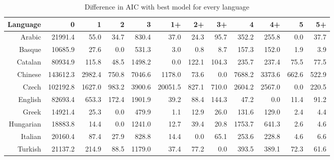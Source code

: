\documentclass[paper=a4, fontsize=11pt]{scrartcl} %
\begin{document}
\begin{table}
\begin{adjustbox}{center}
\centering
\begin{tabular}{rrrrrrrrrrrr}
 Language & 0 & 1 & 2 & 3 & 1+ & 2+ & 3+ & 4 & 4+ & 5 & 5+ \\
  \midrule
Arabic & 21991.4 & 55.0 & 34.7 & 830.4 & 37.0 & 24.3 & 95.7 & 352.2 & 255.8 & 0.0 & 37.7 \\
  Basque & 10685.9 & 27.6 & 0.0 & 531.3 & 3.0 & 0.8 & 8.7 & 157.3 & 152.0 & 1.9 & 3.9 \\
  Catalan & 80934.9 & 115.8 & 48.5 & 1498.2 & 0.0 & 122.1 & 104.3 & 235.7 & 237.4 & 75.5 & 77.5 \\
  Chinese & 143612.3 & 2982.4 & 750.8 & 7046.6 & 1178.0 & 73.6 & 0.0 & 7688.2 & 3373.6 & 662.6 & 522.9 \\
  Czech & 102192.8 & 1627.0 & 983.2 & 3900.6 & 20051.5 & 827.1 & 710.0 & 2604.2 & 2567.0 & 0.0 & 220.5 \\
  English & 82693.4 & 653.3 & 172.4 & 1901.9 & 39.2 & 88.4 & 144.3 & 47.2 & 0.0 & 11.4 & 91.2 \\
  Greek & 14921.4 & 25.3 & 0.0 & 479.9 & 1.1 & 12.9 & 26.0 & 131.6 & 129.0 & 2.4 & 4.4 \\
  Hungarian & 18883.8 & 14.4 & 0.0 & 1241.0 & 12.7 & 39.4 & 20.8 & 1753.7 & 641.3 & 2.6 & 4.6 \\
  Italian & 20160.4 & 87.4 & 27.9 & 828.8 & 14.4 & 0.0 & 65.1 & 253.6 & 228.8 & 4.6 & 6.6 \\
  Turkish & 21137.2 & 214.9 & 88.5 & 1179.0 & 37.4 & 77.2 & 0.0 & 393.5 & 389.1 & 72.3 & 61.6 \\
   \bottomrule
\end{tabular}
\end{adjustbox}
\caption{Difference in AIC with best model for every language}
\label{tab:daic}
\end{table}
\end{document}
